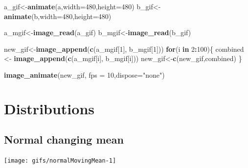 \documentclass[
]{book}
\newenvironment{Shaded}{\begin{snugshade}}{\end{snugshade}}
\newcommand{\AttributeTok}[1]{\textcolor[rgb]{0.13,0.29,0.53}{#1}}
\newcommand{\ControlFlowTok}[1]{\textcolor[rgb]{0.13,0.29,0.53}{\textbf{#1}}}
\newcommand{\DecValTok}[1]{\textcolor[rgb]{0.00,0.00,0.81}{#1}}
\newcommand{\FunctionTok}[1]{\textcolor[rgb]{0.13,0.29,0.53}{\textbf{#1}}}
\newcommand{\NormalTok}[1]{#1}
\newcommand{\OtherTok}[1]{\textcolor[rgb]{0.56,0.35,0.01}{#1}}
\newcommand{\SpecialCharTok}[1]{\textcolor[rgb]{0.81,0.36,0.00}{\textbf{#1}}}
\newcommand{\StringTok}[1]{\textcolor[rgb]{0.31,0.60,0.02}{#1}}
\begin{document}
\begin{Shaded}
\begin{Highlighting}[]
\NormalTok{a\_gif}\OtherTok{\textless{}{-}}\FunctionTok{animate}\NormalTok{(a,}\AttributeTok{width=}\DecValTok{480}\NormalTok{,}\AttributeTok{height=}\DecValTok{480}\NormalTok{)}
\NormalTok{b\_gif}\OtherTok{\textless{}{-}}\FunctionTok{animate}\NormalTok{(b,}\AttributeTok{width=}\DecValTok{480}\NormalTok{,}\AttributeTok{height=}\DecValTok{480}\NormalTok{)}

\NormalTok{a\_mgif}\OtherTok{\textless{}{-}}\FunctionTok{image\_read}\NormalTok{(a\_gif)}
\NormalTok{b\_mgif}\OtherTok{\textless{}{-}}\FunctionTok{image\_read}\NormalTok{(b\_gif)}

\NormalTok{new\_gif}\OtherTok{\textless{}{-}}\FunctionTok{image\_append}\NormalTok{(}\FunctionTok{c}\NormalTok{(a\_mgif[}\DecValTok{1}\NormalTok{], b\_mgif[}\DecValTok{1}\NormalTok{]))}
\ControlFlowTok{for}\NormalTok{(i }\ControlFlowTok{in} \DecValTok{2}\SpecialCharTok{:}\DecValTok{100}\NormalTok{)\{}
\NormalTok{  combined }\OtherTok{\textless{}{-}} \FunctionTok{image\_append}\NormalTok{(}\FunctionTok{c}\NormalTok{(a\_mgif[i], b\_mgif[i]))}
\NormalTok{  new\_gif}\OtherTok{\textless{}{-}}\FunctionTok{c}\NormalTok{(new\_gif,combined)}
\NormalTok{\}}

\FunctionTok{image\_animate}\NormalTok{(new\_gif, }\AttributeTok{fps =} \DecValTok{10}\NormalTok{,}\AttributeTok{dispose=}\StringTok{"none"}\NormalTok{)}
\end{Highlighting}
\end{Shaded}

\section{Distributions}\label{distributions}

\subsection{Normal changing mean}\label{normal-changing-mean}

\texttt{[image: gifs/normalMovingMean-1]}
\end{document}
